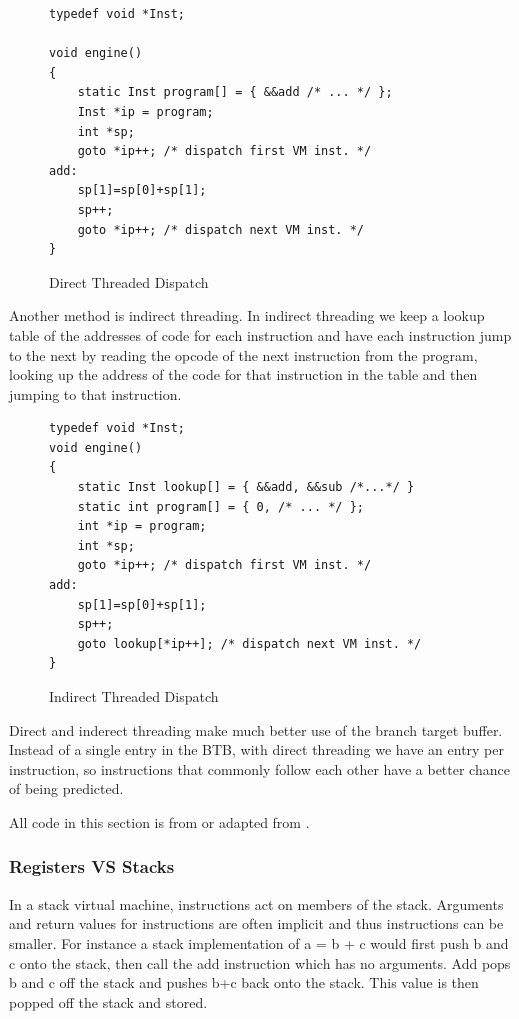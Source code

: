 \documentclass[english,a4paper]{article}
\begin{document}
\begin{figure}
  \begin{lstlisting}
typedef void *Inst; 

void engine() 
{ 
    static Inst program[] = { &&add /* ... */ }; 
    Inst *ip = program; 
    int *sp; 
    goto *ip++; /* dispatch first VM inst. */ 
add: 
    sp[1]=sp[0]+sp[1]; 
    sp++; 
    goto *ip++; /* dispatch next VM inst. */ 
}
  \end{lstlisting}
  \caption{Direct Threaded Dispatch}
  \label{fig:direct}
\end{figure}

Another method is indirect threading. In indirect threading we keep a
lookup table of the addresses of code for each instruction and have
each instruction jump to the next by reading the opcode of the next
instruction from the program, looking up the address of the code for
that instruction in the table and then jumping to that instruction.

\begin{figure}
  \begin{lstlisting}
typedef void *Inst;
void engine() 
{ 
    static Inst lookup[] = { &&add, &&sub /*...*/ }
    static int program[] = { 0, /* ... */ }; 
    int *ip = program; 
    int *sp; 	
    goto *ip++; /* dispatch first VM inst. */ 
add: 
    sp[1]=sp[0]+sp[1]; 
    sp++; 
    goto lookup[*ip++]; /* dispatch next VM inst. */ 
}
  \end{lstlisting}
  \caption{Indirect Threaded Dispatch}
  \label{fig:indirect}
\end{figure}

Direct and inderect threading make much better use of the branch
target buffer. Instead of a single entry in the BTB, with direct
threading we have an entry per instruction, so instructions that
commonly follow each other have a better chance of being predicted.

All code in this section is from or adapted from \cite{Ertl}.


\subsubsection{Registers VS Stacks}
In a stack virtual machine, instructions act on members of the
stack. Arguments and return values for instructions are often implicit
and thus instructions can be smaller. For instance a stack
implementation of a = b + c would first push b and c onto the stack,
then call the add instruction which has no arguments. Add pops b and c
off the stack and pushes b+c back onto the stack. This value is then
popped off the stack and stored.
\end{document}
